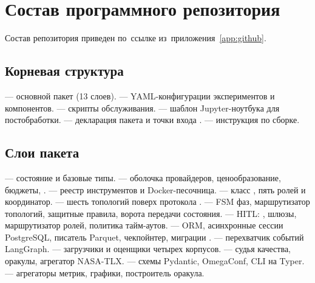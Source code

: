 
\clearpage
\section{Состав программного репозитория}
\label{app:repo}

Состав репозитория приведен по~ссылке из~приложения~\ref{app:github}.

\begingroup
\small

\subsection*{Корневая структура}

\noindent\textbf{} --- основной пакет (13 слоев).\quad
\textbf{} --- YAML-конфигурации экспериментов и
компонентов.\quad
\textbf{} --- скрипты обслуживания.\quad
\textbf{} --- шаблон Jupyter-ноутбука для
постобработки.\quad
\textbf{} --- декларация пакета и точки
входа .\quad
\textbf{} --- инструкция по сборке.

\subsection*{Слои пакета }

\noindent\textbf{} --- состояние и базовые типы.\quad
\textbf{} --- оболочка провайдеров, ценообразование,
бюджеты, .\quad
\textbf{} --- реестр инструментов и Docker-песочница.\quad
\textbf{} --- класс , пять ролей и
координатор.\quad
\textbf{} --- шесть топологий поверх протокола
.\quad
\textbf{} --- FSM фаз, маршрутизатор топологий,
защитные правила, ворота передачи состояния.\quad
\textbf{} --- HITL: , шлюзы,
маршрутизатор ролей, политика тайм-аутов.\quad
\textbf{} --- ORM, асинхронные сессии PostgreSQL,
писатель Parquet, чекпойнтер, миграции .\quad
\textbf{} --- перехватчик событий LangGraph.\quad
\textbf{} --- загрузчики и оценщики четырех корпусов.\quad
\textbf{} --- судья качества, оракулы,
агрегатор NASA-TLX.\quad
\textbf{} --- схемы Pydantic, OmegaConf,
CLI на Typer.\quad
\textbf{} --- агрегаторы метрик, графики,
построитель оракула.

